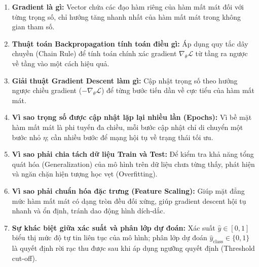 \documentclass[12pt,a4paper]{report}
\begin{document}
\begin{enumerate}[label=\textbf{\arabic*.}]
    \item \textbf{Gradient là gì:} Vector chứa các đạo hàm riêng của hàm mất mát đối với từng trọng số, chỉ hướng tăng nhanh nhất của hàm mất mát trong không gian tham số.
    \item \textbf{Thuật toán Backpropagation tính toán điều gì:} Áp dụng quy tắc dây chuyền (Chain Rule) để tính toán chính xác gradient $\nabla_\theta \mathcal{L}$ từ tầng ra ngược về tầng vào một cách hiệu quả.
    \item \textbf{Giải thuật Gradient Descent làm gì:} Cập nhật trọng số theo hướng ngược chiều gradient ($-\nabla_\theta \mathcal{L}$) để từng bước tiến dần về cực tiểu của hàm mất mát.
    \item \textbf{Vì sao trọng số được cập nhật lặp lại nhiều lần (Epochs):} Vì bề mặt hàm mất mát là phi tuyến đa chiều, mỗi bước cập nhật chỉ di chuyển một bước nhỏ $\eta$; cần nhiều bước để mạng hội tụ về trạng thái tối ưu.
    \item \textbf{Vì sao phải chia tách dữ liệu Train và Test:} Để kiểm tra khả năng tổng quát hóa (Generalization) của mô hình trên dữ liệu chưa từng thấy, phát hiện và ngăn chặn hiện tượng học vẹt (Overfitting).
    \item \textbf{Vì sao phải chuẩn hóa đặc trưng (Feature Scaling):} Giúp mặt đẳng mức hàm mất mát có dạng tròn đều đối xứng, giúp gradient descent hội tụ nhanh và ổn định, tránh dao động hình dích-dắc.
    \item \textbf{Sự khác biệt giữa xác suất và phân lớp dự đoán:} Xác suất $\hat{y} \in [0, 1]$ biểu thị mức độ tự tin liên tục của mô hình; phân lớp dự đoán $\hat{y}_{\text{class}} \in \{0, 1\}$ là quyết định rời rạc thu được sau khi áp dụng ngưỡng quyết định (Threshold cut-off).
\end{enumerate}
\end{document}
